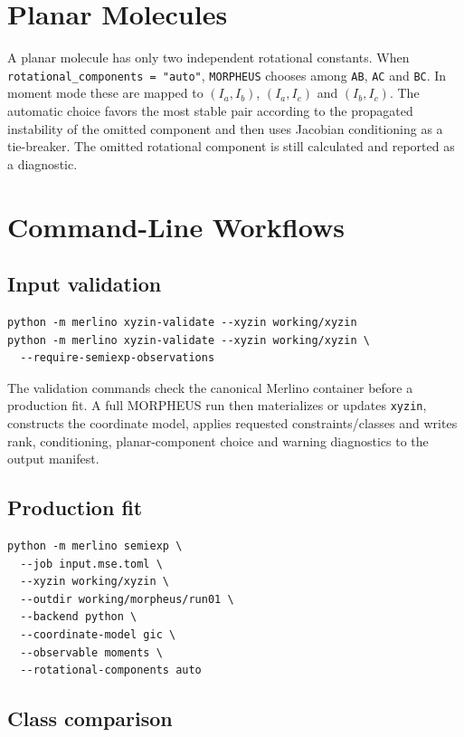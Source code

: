\documentclass[11pt]{article}
\newcommand{\program}{\texttt{MORPHEUS}}
\newcommand{\xyzin}{\texttt{xyzin}}
\begin{document}
\section{Planar Molecules}

A planar molecule has only two independent rotational constants.  When
\texttt{rotational\_components = "auto"}, \program{} chooses among
\texttt{AB}, \texttt{AC} and \texttt{BC}.  In moment mode these are mapped to
\((I_a,I_b)\), \((I_a,I_c)\) and \((I_b,I_c)\).  The automatic choice favors
the most stable pair according to the propagated instability of the omitted
component and then uses Jacobian conditioning as a tie-breaker.  The omitted
rotational component is still calculated and reported as a diagnostic.

\section{Command-Line Workflows}

\subsection{Input validation}

\begin{lstlisting}[style=merlino]
python -m merlino xyzin-validate --xyzin working/xyzin
python -m merlino xyzin-validate --xyzin working/xyzin \
  --require-semiexp-observations
\end{lstlisting}

\noindent
The validation commands check the canonical Merlino container before a
production fit.  A full MORPHEUS run then materializes or updates \xyzin{},
constructs the coordinate model, applies requested constraints/classes and
writes rank, conditioning, planar-component choice and warning diagnostics to
the output manifest.

\subsection{Production fit}

\begin{lstlisting}[style=merlino]
python -m merlino semiexp \
  --job input.mse.toml \
  --xyzin working/xyzin \
  --outdir working/morpheus/run01 \
  --backend python \
  --coordinate-model gic \
  --observable moments \
  --rotational-components auto
\end{lstlisting}

\subsection{Class comparison}
\end{document}
